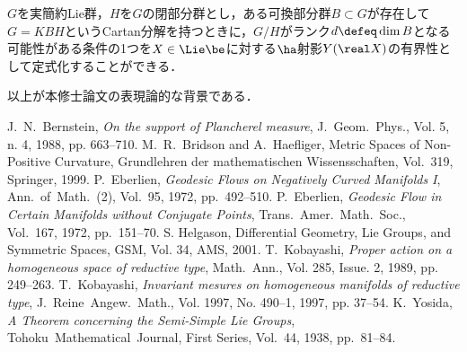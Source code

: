 \documentclass[12pt,dvipdfmx,uplatex]{jsarticle}
\begin{document}
$G$を実簡約Lie群，$H$を$G$の閉部分群とし，ある可換部分群$B\subset G$が存在して$G = KBH $というCartan分解を持つときに，$G/H$がランク$d \defeq \dim B $となる可能性がある条件の1つを$X\in \Lie \be$に対する$\ha$射影$Y(\real X) $の有界性として定式化することができる．

以上が本修士論文の表現論的な背景である．


\clearpage
\begin{thebibliography}{99}
  \vspace{-0.5em}
 J.~N.~Bernstein, \textit{On the support of Plancherel measure}, J.~Geom.~Phys., Vol. 5, n. 4, 1988, pp. 663--710.
 M.~R.~Bridson and A.~Haefliger, Metric Spaces of Non-Positive Curvature, Grundlehren der mathematischen Wissensschaften, Vol.~319, Springer, 1999.
 P.~Eberlien, \textit{Geodesic Flows on Negatively Curved Manifolds I}, Ann.~of~Math.~(2), Vol.~95, 1972, pp.~492--510.
 P.~Eberlien, \textit{Geodesic Flow in Certain Manifolds without Conjugate Points}, Trans.~Amer.~Math.~Soc., Vol.~167, 1972, pp.~151--70.
 S. Helgason, Differential Geometry, Lie Groups, and Symmetric Spaces, GSM, Vol. 34, AMS, 2001.
 T.~Kobayashi, 
  \textit{Proper action on a homogeneous space of reductive type},
  Math.~Ann., Vol. 285, Issue. 2, 1989, pp. 249--263.  
 T.~Kobayashi, \textit{Invariant mesures on homogeneous manifolds of reductive type}, J.~Reine~Angew.~Math., Vol. 1997, No. 490--1, 1997, pp. 37--54.
 K.~Yosida, \textit{A Theorem concerning the Semi-Simple Lie Groups}, \\Tohoku~Mathematical~Journal, First Series, Vol.~44, 1938, pp.~81--84.
\end{thebibliography}
\end{document}
